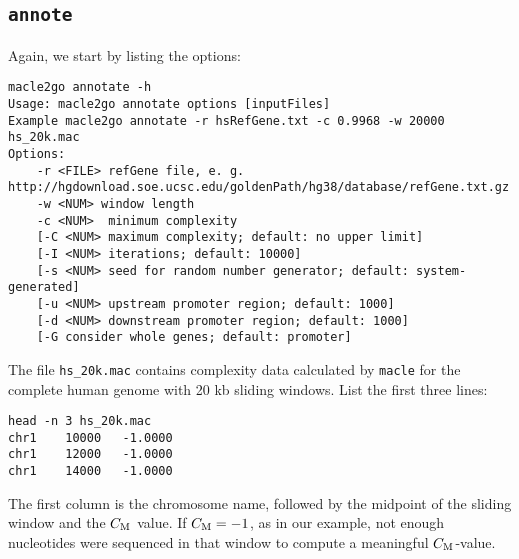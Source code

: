 \documentclass[a4paper]{article}
\newcommand{\ty}{\texttt}
\newcommand{\cm}{C_{\rm M}}
\begin{document}
\subsection{\ty{annote}}
Again, we start by listing the options:
\begin{lstlisting}
macle2go annotate -h
Usage: macle2go annotate options [inputFiles]
Example macle2go annotate -r hsRefGene.txt -c 0.9968 -w 20000 hs_20k.mac
Options:
	-r <FILE> refGene file, e. g. http://hgdownload.soe.ucsc.edu/goldenPath/hg38/database/refGene.txt.gz
	-w <NUM> window length
	-c <NUM>  minimum complexity
	[-C <NUM> maximum complexity; default: no upper limit]
	[-I <NUM> iterations; default: 10000]
	[-s <NUM> seed for random number generator; default: system-generated]
	[-u <NUM> upstream promoter region; default: 1000]
	[-d <NUM> downstream promoter region; default: 1000]
	[-G consider whole genes; default: promoter]
\end{lstlisting}
The file \ty{hs\_20k.mac} contains complexity data calculated by
\ty{macle} for the complete human genome with 20 kb sliding
windows. List the first three lines:
\begin{verbatim}
head -n 3 hs_20k.mac 
chr1	10000	-1.0000
chr1	12000	-1.0000
chr1	14000	-1.0000
\end{verbatim}
The first column is the chromosome name, followed by the
midpoint of the sliding window and the $\cm$ value. If
$\cm=-1$, as in our example, not enough nucleotides were sequenced in that window to
compute a meaningful $\cm$-value.
\end{document}
